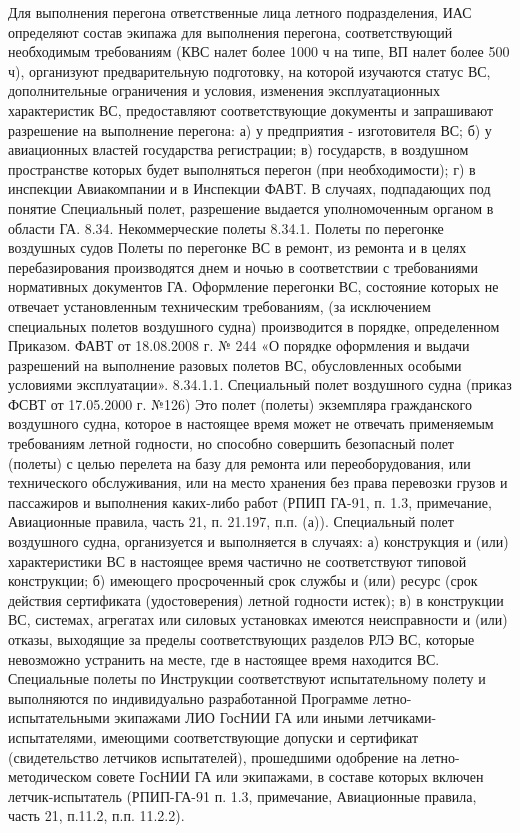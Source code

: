 Для выполнения перегона ответственные лица летного подразделения, ИАС определяют состав экипажа для выполнения перегона, соответствующий необходимым требованиям (КВС налет более 1000 ч на типе, ВП налет более 500 ч), организуют предварительную подготовку, на которой изучаются статус ВС, дополнительные ограничения и условия, изменения эксплуатационных характеристик ВС, предоставляют соответствующие документы и запрашивают разрешение на выполнение перегона:
а)	у предприятия - изготовителя ВС;
б)	у авиационных властей государства регистрации;
в)	государств, в воздушном пространстве которых будет выполняться перегон (при необходимости);
г)	в инспекции Авиакомпании и в Инспекции ФАВТ.
В случаях, подпадающих под понятие Специальный полет, разрешение выдается уполномоченным органом в области ГА.
8.34. Некоммерческие полеты
8.34.1. Полеты по перегонке воздушных судов
Полеты по перегонке ВС в ремонт, из ремонта и в целях перебазирования производятся днем и ночью в соответствии с требованиями нормативных документов ГА.
Оформление перегонки ВС, состояние которых не отвечает установленным техническим требованиям, (за исключением специальных полетов воздушного судна) производится в порядке, определенном Приказом. ФАВТ от 18.08.2008 г. № 244 «О порядке оформления и выдачи разрешений на выполнение разовых полетов ВС, обусловленных особыми условиями эксплуатации».
8.34.1.1.	Специальный полет воздушного судна (приказ ФСВТ от 17.05.2000 г. №126) 
Это полет (полеты) экземпляра гражданского воздушного судна, которое в настоящее время может не отвечать применяемым требованиям летной годности, но способно совершить безопасный полет (полеты) с целью перелета на базу для ремонта или переоборудования, или технического обслуживания, или на место хранения без права перевозки грузов и пассажиров и выполнения каких-либо работ (РПИП ГА-91, п. 1.3, примечание, Авиационные правила, часть 21, п. 21.197, п.п. (а)).
Специальный полет воздушного судна, организуется и выполняется в случаях:
а)	конструкция и (или) характеристики ВС в настоящее время частично не соответствуют типовой конструкции;
б)	имеющего просроченный срок службы и (или) ресурс (срок действия сертификата (удостоверения) летной годности истек);
в)	в конструкции ВС, системах, агрегатах или силовых установках имеются неисправности и (или) отказы, выходящие за пределы соответствующих разделов РЛЭ ВС, которые невозможно устранить на месте, где в настоящее время находится ВС.
Специальные полеты по Инструкции соответствуют испытательному полету и выполняются по индивидуально разработанной Программе летно-испытательными экипажами ЛИО ГосНИИ ГА или иными летчиками-испытателями, имеющими соответствующие допуски и сертификат (свидетельство летчиков испытателей), прошедшими одобрение на летно-методическом совете ГосНИИ ГА или экипажами, в составе которых включен летчик-испытатель (РПИП-ГА-91 п. 1.3, примечание, Авиационные правила, часть 21, п.11.2, п.п. 11.2.2).

